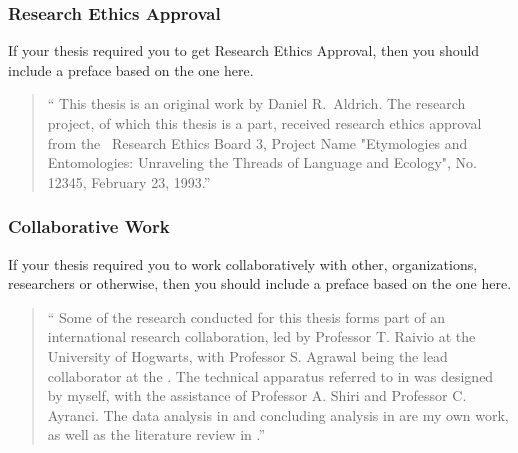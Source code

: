 
			
			
			\subsubsection{Research Ethics Approval}\label{preface:REA}
				If your thesis required you to get Research Ethics Approval, then you should include a preface based on the one here.

				\begin{quote}
					\enquote{%
						This thesis is an original work by Daniel R.\ Aldrich. 
						The research project, of which this thesis is a part, received research ethics approval from the \University\ Research Ethics Board 3, Project Name "Etymologies and Entomologies: Unraveling the Threads of Language and Ecology", No. 12345, February 23, 1993.}%
				\end{quote}

			\subsubsection{Collaborative Work}\label{preface:CW}
				If your thesis required you to work collaboratively with other, organizations, researchers or otherwise, then you should include a preface based on the one here.

				\begin{quote}
					\enquote{%
						Some of the research conducted for this thesis forms part of an international research collaboration, led by Professor T. Raivio at the University of Hogwarts, with Professor S. Agrawal being the lead collaborator at the \University. 
						The technical apparatus referred to in  was designed by myself, with the assistance of Professor A. Shiri and Professor C. Ayranci. 
						The data analysis in  and concluding analysis in  are my own work, as well as the literature review in .}
				\end{quote}

